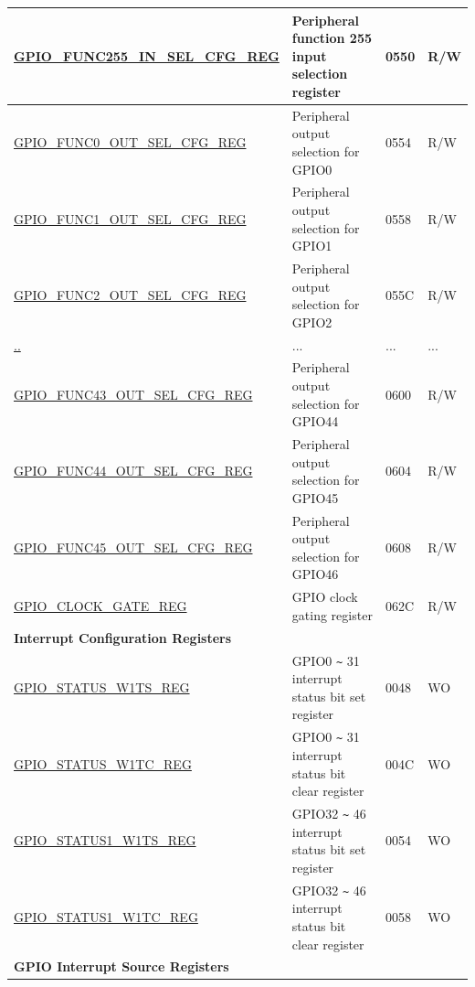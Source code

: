 \begin{longtable}{ | p{6cm} | p{7.2cm} | p{1.3cm} | p{1cm} | }
\hyperref[regdesc:GPIOFUNCNINSELCFGREG]{GPIO\_FUNC255\_IN\_SEL\_CFG\_REG} & Peripheral function 255 input selection register & \hexprefix{}0550 & R/W \\ \hline
\hyperref[regdesc:GPIOFUNCNOUTSELCFGREG]{GPIO\_FUNC0\_OUT\_SEL\_CFG\_REG} & Peripheral output selection for GPIO0 & \hexprefix{}0554 & R/W \\ \hline
\hyperref[regdesc:GPIOFUNCNOUTSELCFGREG]{GPIO\_FUNC1\_OUT\_SEL\_CFG\_REG} & Peripheral output selection for GPIO1 & \hexprefix{}0558 & R/W \\ \hline
\hyperref[regdesc:GPIOFUNCNOUTSELCFGREG]{GPIO\_FUNC2\_OUT\_SEL\_CFG\_REG} & Peripheral output selection for GPIO2 & \hexprefix{}055C & R/W \\ \hline
\hyperref[regdesc:GPIOFUNCNOUTSELCFGREG]{..} & ... & ... & ... \\ \hline
\hyperref[regdesc:GPIOFUNCNOUTSELCFGREG]{GPIO\_FUNC43\_OUT\_SEL\_CFG\_REG} & Peripheral output selection for GPIO44 & \hexprefix{}0600 & R/W \\ \hline
\hyperref[regdesc:GPIOFUNCNOUTSELCFGREG]{GPIO\_FUNC44\_OUT\_SEL\_CFG\_REG} & Peripheral output selection for GPIO45 & \hexprefix{}0604 & R/W \\ \hline
\hyperref[regdesc:GPIOFUNCNOUTSELCFGREG]{GPIO\_FUNC45\_OUT\_SEL\_CFG\_REG} & Peripheral output selection for GPIO46 & \hexprefix{}0608 & R/W \\ \hline
\hyperref[regdesc:GPIOCLOCKGATEREG]{GPIO\_CLOCK\_GATE\_REG} & GPIO clock gating register & \hexprefix{}062C & R/W \\ \hline
\multicolumn{4}{|l|}{\textbf{Interrupt Configuration Registers}} \\ \hline
\hyperref[regdesc:GPIOSTATUSW1TSREG]{GPIO\_STATUS\_W1TS\_REG} & GPIO0 \verb+~+ 31 interrupt status bit set register & \hexprefix{}0048 & WO \\ \hline
\hyperref[regdesc:GPIOSTATUSW1TCREG]{GPIO\_STATUS\_W1TC\_REG} & GPIO0 \verb+~+ 31 interrupt status bit clear register & \hexprefix{}004C & WO \\ \hline
\hyperref[regdesc:GPIOSTATUS1W1TSREG]{GPIO\_STATUS1\_W1TS\_REG} & GPIO32 \verb+~+ 46 interrupt status bit set register & \hexprefix{}0054 & WO \\ \hline
\hyperref[regdesc:GPIOSTATUS1W1TCREG]{GPIO\_STATUS1\_W1TC\_REG} & GPIO32 \verb+~+ 46 interrupt status bit clear register & \hexprefix{}0058 & WO \\ \hline
\multicolumn{4}{|l|}{\textbf{GPIO Interrupt Source Registers}} \\ \hline

\end{longtable}
